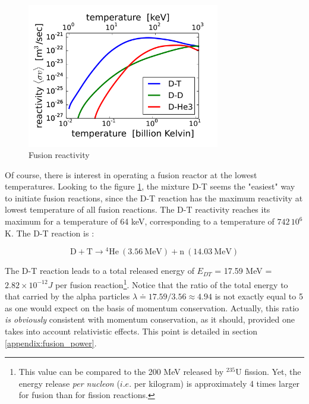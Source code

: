 \begin{figure} 
    \begin{center}
        \includegraphics[width=0.75\textwidth]{figures/reactivity_DT.png}
        \caption{Fusion reactivity }
        \label{fig:reactivity}
    \end{center}
\end{figure}

Of course, there is interest in operating a fusion reactor at the lowest temperatures. Looking to the figure \ref{fig:reactivity}, the mixture D-T seems the "easiest" way to initiate fusion reactions, since the D-T reaction  has the maximum reactivity at lowest temperature of all fusion reactions. The D-T reactivity reaches its maximum for a temperature of 64 keV, corresponding to a temperature of $742\,10^6$ K. The D-T reaction is \cite{FusionCEA1987}: 

\begin{equation*}
    \mathrm{D + T} \longrightarrow \mathrm{{}^4 He~(3.56~MeV) + n~(14.03~MeV)}
\end{equation*}

The D-T reaction leads to a total released energy of $E_{DT}$ = 17.59 \si{MeV} = $2.82\times 10^{-12} \si{J}$ per fusion reaction\footnote{This value can be compared to the 200 MeV released by $^{235}$U fission. Yet, the energy release \emph{per nucleon} ($i.e.$ per kilogram) is approximately 4 times larger for fusion than for fission reactions.}. Notice that the ratio of the total energy to that carried by the alpha particles $\lambda \doteq 17.59/3.56 \approx 4.94$ is not exactly equal to 5 as one would expect on the basis of momentum conservation. Actually, this ratio \emph{is obviously} consistent with momentum conservation, as it should, provided one takes into account relativistic effects. This point is detailed in section \ref{appendix:fusion_power}.

